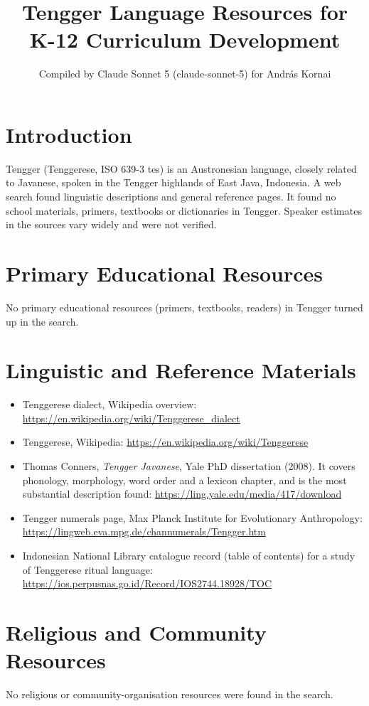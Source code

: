\documentclass[12pt]{article}
\title{Tengger Language Resources for K-12 Curriculum Development}
\author{Compiled by Claude Sonnet 5 (claude-sonnet-5) for Andr\'as Kornai}
\date{}
\begin{document}
\maketitle

\section{Introduction}
Tengger (Tenggerese, ISO 639-3 tes) is an Austronesian language, closely related to Javanese, spoken in the Tengger highlands of East Java, Indonesia. A web search found linguistic descriptions and general reference pages. It found no school materials, primers, textbooks or dictionaries in Tengger. Speaker estimates in the sources vary widely and were not verified.

\section{Primary Educational Resources}
No primary educational resources (primers, textbooks, readers) in Tengger turned up in the search.

\section{Linguistic and Reference Materials}
\begin{itemize}
\item Tenggerese dialect, Wikipedia overview: \url{https://en.wikipedia.org/wiki/Tenggerese_dialect}
\item Tenggerese, Wikipedia: \url{https://en.wikipedia.org/wiki/Tenggerese}
\item Thomas Conners, \emph{Tengger Javanese}, Yale PhD dissertation (2008). It covers phonology, morphology, word order and a lexicon chapter, and is the most substantial description found: \url{https://ling.yale.edu/media/417/download}
\item Tengger numerals page, Max Planck Institute for Evolutionary Anthropology: \url{https://lingweb.eva.mpg.de/channumerals/Tengger.htm}
\item Indonesian National Library catalogue record (table of contents) for a study of Tenggerese ritual language: \url{https://ios.perpusnas.go.id/Record/IOS2744.18928/TOC}
\end{itemize}

\section{Religious and Community Resources}
No religious or community-organisation resources were found in the search.
\end{document}
